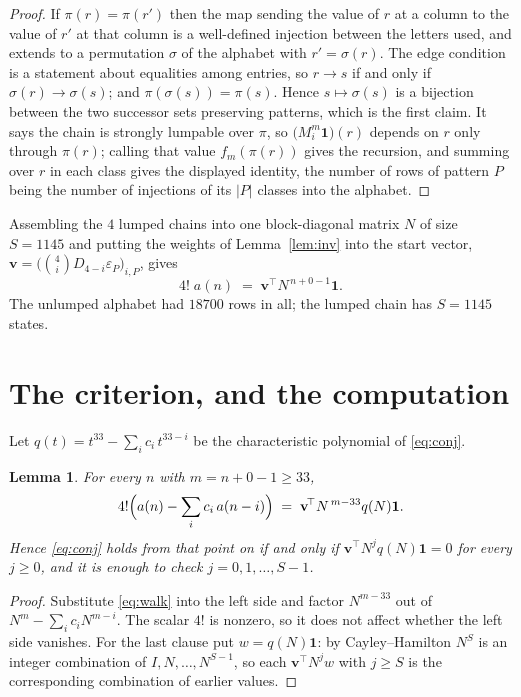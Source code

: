 \documentclass[11pt,a4paper]{article}
\theoremstyle{plain}
\newtheorem{lemma}[theorem]{Lemma}
\theoremstyle{definition}
\begin{document}
\begin{proof}
If $\pi(r)=\pi(r')$ then the map sending the value of $r$ at a column to the value of $r'$
at that column is a well-defined injection between the letters used, and extends to a
permutation $\sigma$ of the alphabet with $r'=\sigma(r)$. The edge condition is a statement
about equalities among entries, so $r\to s$ if and only if $\sigma(r)\to\sigma(s)$; and
$\pi(\sigma(s))=\pi(s)$. Hence $s\mapsto\sigma(s)$ is a bijection between the two successor
sets preserving patterns, which is the first claim. It says the chain is strongly lumpable
over $\pi$, so $\bigl(M_i^{m}\mathbf{1}\bigr)(r)$ depends on $r$ only through $\pi(r)$;
calling that value $f_m(\pi(r))$ gives the recursion, and summing over $r$ in each class
gives the displayed identity, the number of rows of pattern $P$ being the number of
injections of its $|P|$ classes into the alphabet.
\end{proof}

Assembling the $4$ lumped chains into one block-diagonal matrix $N$ of size $S=1145$ and
putting the weights of Lemma~\ref{lem:inv} into the start vector,
$\mathbf{v}=\bigl(\binom{4}{i}D_{4-i}\varepsilon_P\bigr)_{i,P}$, gives
\begin{equation}\label{eq:walk}
4!\;a(n)\;=\;\mathbf{v}^{\!\top}N^{\,n+0-1}\mathbf{1} .
\end{equation}
The unlumped alphabet had $18700$ rows in all; the lumped chain has $S=1145$ states.

\section{The criterion, and the computation}

Let $q(t)=t^{33}-\sum_i c_i\,t^{33-i}$ be the characteristic polynomial of
\eqref{eq:conj}.

\begin{lemma}\label{lem:crit}
For every $n$ with $m=n+0-1\ge33$,
\[
4!\Bigl(a(n)-\sum_i c_i\,a(n-i)\Bigr)\;=\;\mathbf{v}^{\!\top}N^{\,m-33}q(N)\mathbf{1} .
\]
Hence \eqref{eq:conj} holds from that point on if and only if
$\mathbf{v}^{\!\top}N^{j}q(N)\mathbf{1}=0$ for every $j\ge0$, and it is enough to check
$j=0,1,\dots,S-1$.
\end{lemma}

\begin{proof}
Substitute \eqref{eq:walk} into the left side and factor $N^{m-33}$ out of
$N^{m}-\sum_i c_iN^{m-i}$. The scalar $4!$ is nonzero, so it does not affect whether
the left side vanishes. For the last clause put $w=q(N)\mathbf{1}$: by Cayley--Hamilton
$N^{S}$ is an integer combination of $I,N,\dots,N^{S-1}$, so each
$\mathbf{v}^{\!\top}N^{j}w$ with $j\ge S$ is the corresponding combination of earlier
values.
\end{proof}
\end{document}
